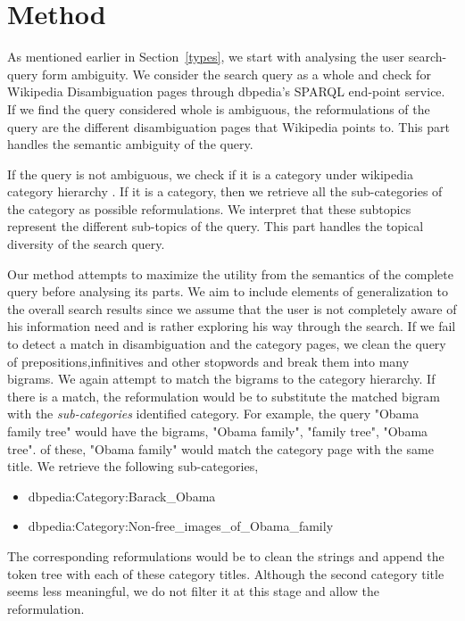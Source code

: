 \documentclass[11pt]{article}
\begin{document}
\section{Method}
\label{sec:method}
As mentioned earlier in Section~\ref{types}, we start with analysing the user search-
query form ambiguity. We consider the search query as a whole and check for Wikipedia
Disambiguation pages \cite{wikidisamb:Online} through dbpedia's SPARQL end-point 
service. If we find the query considered whole is ambiguous, the reformulations 
of the query are the different disambiguation pages that Wikipedia points to. This part 
handles the semantic ambiguity of the query.

If the query is not ambiguous, we check if it is a category under wikipedia category hierarchy
\cite{wikicat:Online}. If it is a category, then we retrieve all the sub-categories of the 
category as possible reformulations. We interpret that these subtopics represent the different 
sub-topics of the query. This part handles the topical diversity of the search query.

Our method attempts to maximize the utility from the semantics of the complete query before 
analysing its parts. We aim to include elements of generalization to the overall search results 
since we assume that the user is not completely aware of his information need and is rather 
exploring his way through the search. If we fail to detect a match in disambiguation and the 
category pages, we clean the query of prepositions,infinitives and other stopwords and break them 
into many bigrams. We again attempt to match the bigrams to the category hierarchy. If there is a 
match, the reformulation would be to substitute the matched bigram with the {\it sub-categories} 
identified category. For example, the query "Obama family tree" would have the bigrams,
"Obama family", "family tree", "Obama tree". of these, "Obama family" would match the 
category page with the same title. We retrieve the following sub-categories,
\begin{itemize}
\item dbpedia:Category:Barack\_Obama
\item dbpedia:Category:Non-free\_images\_of\_Obama\_family
\end{itemize}
The corresponding reformulations would be to clean the strings and append the token tree with each of 
these category titles. Although the second category title seems less meaningful, we do not filter it 
at this stage and allow the reformulation.
\end{document}
